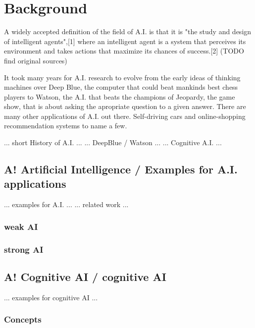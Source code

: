 \chapter{Background}

A widely accepted definition of the field of A.I. is that it is "the study and design of intelligent agents",[1] where an intelligent agent is a system that perceives its environment and takes actions that maximize its chances of success.[2] (TODO find original sources)

It took many years for A.I. research to evolve from the early ideas of thinking machines over Deep Blue, the computer that could beat mankinds best chess players to Watson, the A.I. that beats the champions of Jeopardy, the game show, that is about asking the apropriate question to a given answer. There are many other applications of A.I. out there. Self-driving cars and online-shopping recommendation systems to name a few.

... short History of A.I. ...
... DeepBlue / Watson ...
... Cognitive A.I. ...

\section{A! Artificial Intelligence / Examples for A.I. applications}
... examples for A.I. ...
... related work ...

\subsection{weak AI}

\subsection{strong AI}

\section{A! Cognitive AI / cognitive AI}
... examples for cognitive AI ...

\subsection{Concepts}

